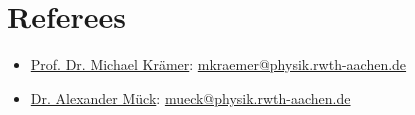 \documentclass{article}
\begin{document}
\section*{Referees}

\begin{itemize}

\item \textcolor{blue}{\href{https://www.particle-theory.rwth-aachen.de/cms/Particle-Theory/Das-Institut/Mitarbeiter-TTK/Professoren/~ggbq/Kraemer-Michael/}{Prof. Dr. Michael Krämer}}: \textcolor{blue}{\href{mailto:mkraemer@physik.rwth-aachen.de}{mkraemer@physik.rwth-aachen.de} }


\item \textcolor{blue}{\href{https://www.physik.rwth-aachen.de/go/id/dwqp/gguid/0x77F3E5EE891C184AB09DDB02432A6208/ikz/11/allou/1}{Dr. Alexander Mück}}: \textcolor{blue}{\href{mailto:mueck@physik.rwth-aachen.de}{mueck@physik.rwth-aachen.de} }

\end{itemize}
\end{document}
